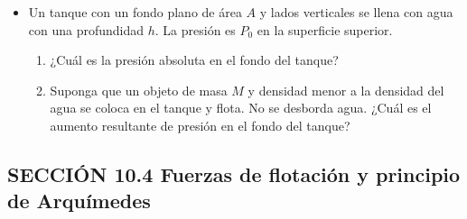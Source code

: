 \documentclass[11pt,a4paper]{article}
\begin{document}
\begin{itemize}
    \vspace*{7cm}
    
    \item[\textbf{10.}] Un tanque con un fondo plano de área \(A\) y lados verticales se llena con agua con una profundidad \(h\). La presión es \(P_0\) en la superficie superior.
    \begin{enumerate}
        \item ¿Cuál es la presión absoluta en el fondo del tanque?
        \item Suponga que un objeto de masa \(M\) y densidad menor a la densidad del agua se coloca en el tanque y flota. No se desborda agua. ¿Cuál es el aumento resultante de presión en el fondo del tanque?
    \end{enumerate}
    \vspace*{7cm}
\end{itemize}

\newpage

\subsection*{SECCIÓN 10.4 Fuerzas de flotación y principio de Arquímedes}
\end{document}
